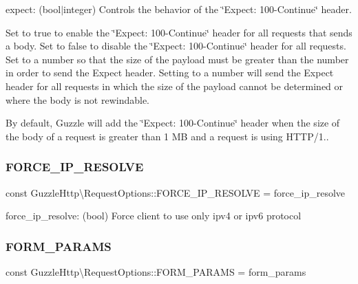 expect\+: (bool$\vert$integer) Controls the behavior of the \char`\"{}\+Expect\+: 100-\/\+Continue\char`\"{} header.

Set to {\ttfamily true} to enable the \char`\"{}\+Expect\+: 100-\/\+Continue\char`\"{} header for all requests that sends a body. Set to {\ttfamily false} to disable the \char`\"{}\+Expect\+: 100-\/\+Continue\char`\"{} header for all requests. Set to a number so that the size of the payload must be greater than the number in order to send the Expect header. Setting to a number will send the Expect header for all requests in which the size of the payload cannot be determined or where the body is not rewindable.

By default, Guzzle will add the \char`\"{}\+Expect\+: 100-\/\+Continue\char`\"{} header when the size of the body of a request is greater than 1 MB and a request is using H\+T\+T\+P/1.. \mbox{\label{classGuzzleHttp_1_1RequestOptions_a04cdbf8ea0ffe4867a265681214d72b4}} 
\subsubsection{\texorpdfstring{F\+O\+R\+C\+E\+\_\+\+I\+P\+\_\+\+R\+E\+S\+O\+L\+VE}{FORCE\_IP\_RESOLVE}}
{\footnotesize\ttfamily const Guzzle\+Http\textbackslash{}\+Request\+Options\+::\+F\+O\+R\+C\+E\+\_\+\+I\+P\+\_\+\+R\+E\+S\+O\+L\+VE = \textquotesingle{}force\+\_\+ip\+\_\+resolve\textquotesingle{}}

force\+\_\+ip\+\_\+resolve\+: (bool) Force client to use only ipv4 or ipv6 protocol \mbox{\label{classGuzzleHttp_1_1RequestOptions_a5e871b3bba396f3dc5489c802ec68733}} 
\subsubsection{\texorpdfstring{F\+O\+R\+M\+\_\+\+P\+A\+R\+A\+MS}{FORM\_PARAMS}}
{\footnotesize\ttfamily const Guzzle\+Http\textbackslash{}\+Request\+Options\+::\+F\+O\+R\+M\+\_\+\+P\+A\+R\+A\+MS = \textquotesingle{}form\+\_\+params\textquotesingle{}}


